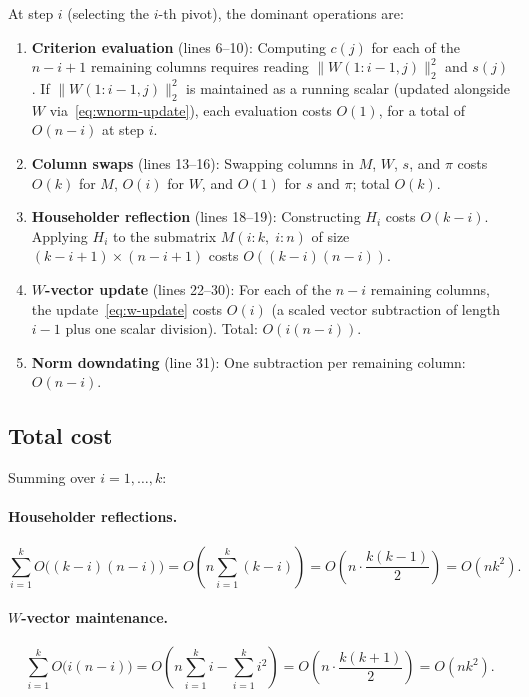 \documentclass[11pt]{article}
\theoremstyle{definition}
\theoremstyle{remark}
\newcommand{\tnorm}[1]{\lVert #1 \rVert_2}
\begin{document}
At step $i$ (selecting the $i$-th pivot), the dominant operations are:

\begin{enumerate}
\item \textbf{Criterion evaluation} (lines 6--10):
  Computing $c(j)$ for each of the $n - i + 1$ remaining columns
  requires reading $\tnorm{W(1:i-1,j)}^2$ and $s(j)$.  If
  $\tnorm{W(1:i-1,j)}^2$ is maintained as a running scalar (updated
  alongside $W$ via~\eqref{eq:wnorm-update}), each evaluation costs
  $O(1)$, for a total of $O(n - i)$ at step $i$.

\item \textbf{Column swaps} (lines 13--16):
  Swapping columns in $M$, $W$, $s$, and $\pi$ costs $O(k)$ for $M$,
  $O(i)$ for $W$, and $O(1)$ for $s$ and $\pi$; total $O(k)$.

\item \textbf{Householder reflection} (lines 18--19):
  Constructing $H_i$ costs $O(k - i)$.  Applying $H_i$ to the
  submatrix $M(i:k,\; i:n)$ of size $(k - i + 1) \times (n - i + 1)$
  costs $O((k - i)(n - i))$.

\item \textbf{$W$-vector update} (lines 22--30):
  For each of the $n - i$ remaining columns, the update~\eqref{eq:w-update}
  costs $O(i)$ (a scaled vector subtraction of length $i-1$ plus one
  scalar division).  Total: $O(i(n - i))$.

\item \textbf{Norm downdating} (line 31):
  One subtraction per remaining column: $O(n - i)$.
\end{enumerate}

\subsection{Total cost}

Summing over $i = 1, \ldots, k$:

\paragraph{Householder reflections.}
\[
  \sum_{i=1}^{k} O\bigl((k-i)(n-i)\bigr)
  = O\!\left(n\sum_{i=1}^{k}(k-i)\right)
  = O\!\left(n \cdot \frac{k(k-1)}{2}\right)
  = O(nk^2).
\]

\paragraph{$W$-vector maintenance.}
\[
  \sum_{i=1}^{k} O\bigl(i(n-i)\bigr)
  = O\!\left(n\sum_{i=1}^{k} i - \sum_{i=1}^{k} i^2\right)
  = O\!\left(n \cdot \frac{k(k+1)}{2}\right)
  = O(nk^2).
\]
\end{document}
